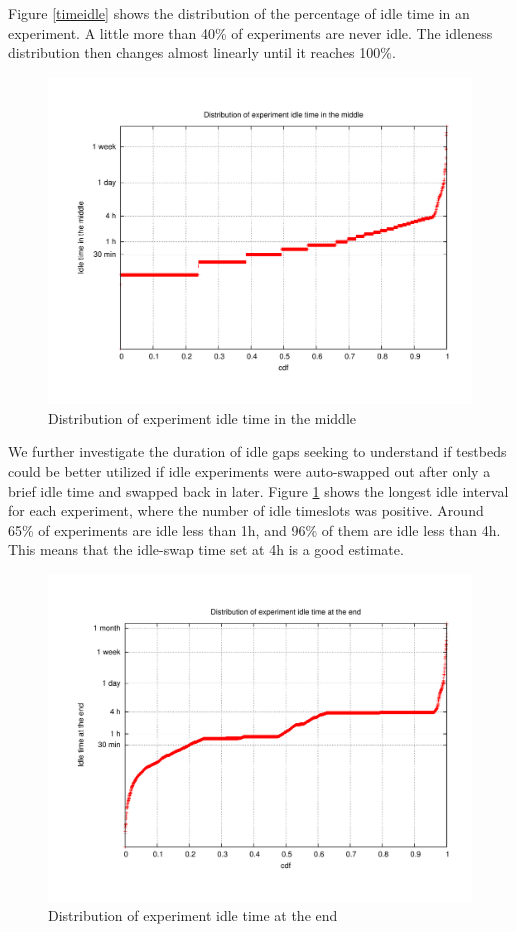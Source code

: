 \documentclass[10pt]{article}
\begin{document}
Figure \ref{timeidle} shows the distribution of the percentage of idle time in an experiment. A little more than 40\% of experiments are never idle. The idleness distribution then changes almost linearly until it reaches 100\%. 

\begin{figure}[htbp]
\begin{center}
\includegraphics[width=5in]{figs/mididle.pdf}
\caption{Distribution of experiment idle time in the middle}
\label{mididle}
\end{center}
\end{figure}

We further investigate the duration of idle gaps seeking to understand if testbeds could be better utilized if idle experiments were auto-swapped out after only a brief idle time and swapped back in later. 
Figure \ref{mididle} shows the longest idle interval for each experiment, where the number of idle timeslots was positive. Around 65\% of experiments are idle less than 1h, and 96\% of them are idle less than 4h. This means that the idle-swap time set at 4h is a good estimate. 

\begin{figure}[htbp]
\begin{center}
\includegraphics[width=5in]{figs/endidle.pdf}
\caption{Distribution of experiment idle time at the end}
\label{endidle}
\end{center}
\end{figure}
\end{document}
